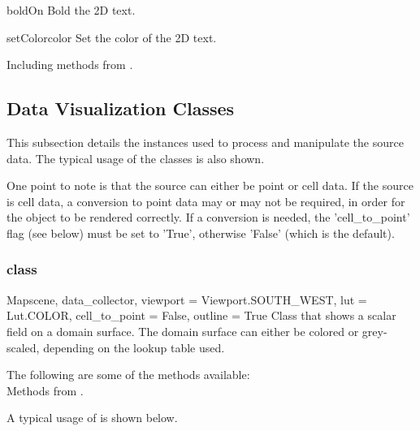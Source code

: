 \begin{methoddesc}[Text2D]{boldOn}{}
Bold the 2D text.
\end{methoddesc}

\begin{methoddesc}[Text2D]{setColor}{color}
Set the color of the 2D text.
\end{methoddesc}

Including methods from \ActorTwoD. 




\subsection{Data Visualization Classes}
This subsection details the instances used to process and manipulate the source
data. The typical usage of the classes is also shown. 

One point to note is that the source can either be point or cell data. If the
source is cell data, a conversion to point data may or may not be
required, in order for the object to be rendered correctly.
If a conversion is needed, the 'cell_to_point' flag (see below) must be set to
'True', otherwise 'False' (which is the default).

\subsubsection{\Map class}

\begin{classdesc}{Map}{scene, data_collector, 
viewport = Viewport.SOUTH_WEST, lut = Lut.COLOR, cell_to_point = False,
outline = True}
Class that shows a scalar field on a domain surface. The domain surface 
can either be colored or grey-scaled, depending on the lookup table used.
\end{classdesc}

The following are some of the methods available:\\
Methods from \ActorThreeD.

A typical usage of \Map is shown below.

